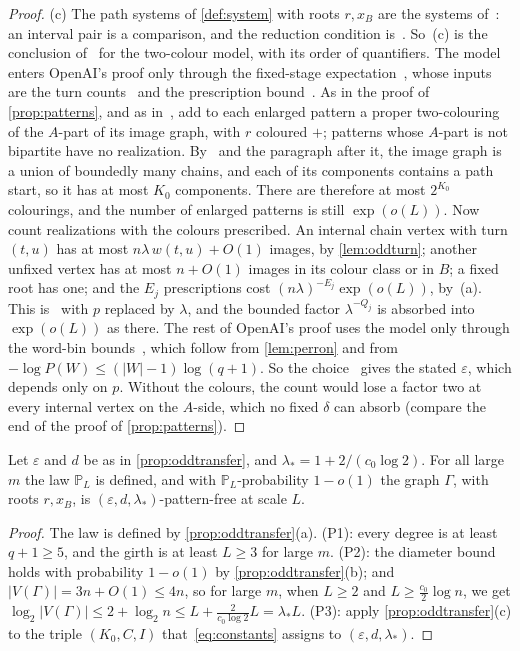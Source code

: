 \documentclass[11pt]{article}
\theoremstyle{definition}
\theoremstyle{plain}
\newcommand{\eps}{\varepsilon}
\begin{document}
\begin{proof}
(c) The path systems of \cref{def:system} with roots $r,x_B$ are the systems of~\cite[Thm.~4.1]{OAI197a}: an interval pair is a comparison, and the reduction condition is~\cite[(4.1)]{OAI197a}. So~(c) is the conclusion of~\cite[Thm.~4.1]{OAI197a} for the two-colour model, with its order of quantifiers. The model enters OpenAI's proof only through the fixed-stage expectation~\cite[(4.11)]{OAI197a}, whose inputs are the turn counts~\cite[(3.6)]{OAI197a} and the prescription bound~\cite[(3.12)]{OAI197a}. As in the proof of \cref{prop:patterns}, and as in~\cite[\S6.1]{Ivanov2026}, add to each enlarged pattern a proper two-colouring of the $A$-part of its image graph, with $r$ coloured $+$; patterns whose $A$-part is not bipartite have no realization. By~\cite[Lemma~4.2]{OAI197a} and the paragraph after it, the image graph is a union of boundedly many chains, and each of its components contains a path start, so it has at most $K_0$ components. There are therefore at most $2^{K_0}$ colourings, and the number of enlarged patterns is still $\exp(o(L))$. Now count realizations with the colours prescribed. An internal chain vertex with turn $(t,u)$ has at most $n\lambda\,w(t,u)+O(1)$ images, by \cref{lem:oddturn}; another unfixed vertex has at most $n+O(1)$ images in its colour class or in $B$; a fixed root has one; and the $E_j$ prescriptions cost $(n\lambda)^{-E_j}\exp(o(L))$, by~(a). This is~\cite[(4.11)]{OAI197a} with $p$ replaced by $\lambda$, and the bounded factor $\lambda^{-Q_j}$ is absorbed into $\exp(o(L))$ as there. The rest of OpenAI's proof uses the model only through the word-bin bounds~\cite[(4.9)]{OAI197a}, which follow from \cref{lem:perron} and from $-\log P(W)\le(|W|-1)\log(q+1)$. So the choice~\cite[(4.15)]{OAI197a} gives the stated $\eps$, which depends only on $p$. Without the colours, the count would lose a factor two at every internal vertex on the $A$-side, which no fixed $\delta$ can absorb (compare the end of the proof of \cref{prop:patterns}).
\end{proof}

\begin{corollary}\label{cor:dfpatternfree}
Let $\eps$ and $d$ be as in \cref{prop:oddtransfer}, and $\lambda_*=1+2/(c_0\log2)$. For all large $m$ the law $\mathbb P_L$ is defined, and with $\mathbb P_L$-probability $1-o(1)$ the graph $\Gamma$, with roots $r,x_B$, is $(\eps,d,\lambda_*)$-pattern-free at scale $L$.
\end{corollary}

\begin{proof}
The law is defined by \cref{prop:oddtransfer}(a). (P1): every degree is at least $q+1\ge5$, and the girth is at least $L\ge3$ for large $m$. (P2): the diameter bound holds with probability $1-o(1)$ by \cref{prop:oddtransfer}(b); and $|V(\Gamma)|=3n+O(1)\le4n$, so for large $m$, when $L\ge2$ and $L\ge\frac{c_0}2\log n$, we get $\log_2|V(\Gamma)|\le2+\log_2n\le L+\frac{2}{c_0\log2}L=\lambda_*L$. (P3): apply \cref{prop:oddtransfer}(c) to the triple $(K_0,C,I)$ that~\eqref{eq:constants} assigns to $(\eps,d,\lambda_*)$.
\end{proof}
\end{document}
